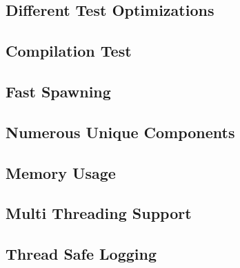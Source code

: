 \subsection{Different Test Optimizations}


\subsection{Compilation Test}

\subsection{Fast Spawning}

\subsection{Numerous Unique Components}

\subsection{Memory Usage}

\subsection{Multi Threading Support}

\subsection{Thread Safe Logging}

